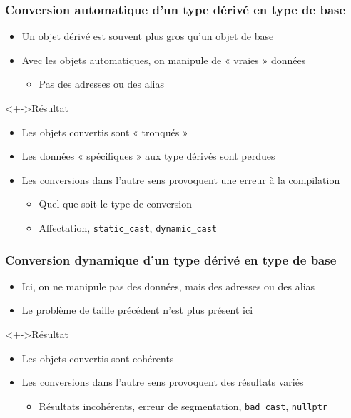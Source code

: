 \begin{frame}
\frametitle{Conversion automatique d'un type dérivé en type de base}
\begin{itemize}[<+->]
\item Un objet dérivé est souvent plus gros qu'un objet de base
\item Avec les objets automatiques, on manipule de « vraies » données
	\begin{itemize}
	\item Pas des adresses ou des alias
	\end{itemize}
\end{itemize}
\begin{alertblock}<+->{Résultat}
	\begin{itemize}[<+->]
	\item Les objets convertis sont « tronqués »
	\item Les données « spécifiques » aux type dérivés sont perdues
	\end{itemize}
\end{alertblock}
\begin{itemize}
\item Les conversions dans l'autre sens provoquent une erreur à la compilation
	\begin{itemize}
	\item Quel que soit le type de conversion
	\item Affectation, \lstinline|static_cast|, \lstinline|dynamic_cast|
	\end{itemize}
\end{itemize}
\end{frame}

\begin{frame}
\frametitle{Conversion dynamique d'un type dérivé en type de base}
\begin{itemize}[<+->]
\item Ici, on ne manipule pas des données, mais des adresses ou des alias
\item Le problème de taille précédent n'est plus présent ici
\end{itemize}
\begin{exampleblock}<+->{Résultat}
	\begin{itemize}[<+->]
	\item Les objets convertis sont cohérents
	\end{itemize}
\end{exampleblock}
\begin{itemize}[<+->]
\item Les conversions dans l'autre sens provoquent des résultats variés
	\begin{itemize}
	\item Résultats incohérents, erreur de segmentation, \lstinline|bad_cast|, \lstinline|nullptr|
	\end{itemize}
\end{itemize}
\end{frame}


